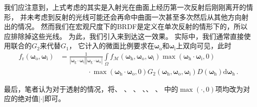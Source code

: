 我们应注意到，上式考虑的其实是入射光在曲面上经历第一次反射后刚刚离开的情形，
并未考虑到反射的光线可能还会再命中曲面一次甚至多次然后从其他方向射出的情况。
然而我们在宏观尺度下的BRDF是定义在单次反射的情形下的，所以应排除掉这些光线。
为此，我们引入来到达这一效果。
实际中，我们通常直接使用联合的$G_2$来代替$G_1$，
它计入的微面比例要求在${\bm\omega}_{\mathrm{o}}$和${\bm\omega}_{\mathrm{i}}$上双向可见，此时
\begin{align}\label{eq:08ex01-MacroBRDFG2}
    f_{\mathrm{r}}({\bm\omega}_{\mathrm{o}},{\bm\omega}_{\mathrm{i}})
     & =\frac{1}{|{\bm\omega}_{\mathrm{g}}\cdot{\bm\omega}_{\mathrm{i}}||{\bm\omega}_{\mathrm{g}}\cdot{\bm\omega}_{\mathrm{o}}|}
    \int\limits_{\varOmega}f_{\mathcal{M}}({\bm\omega}_{\mathrm{h}},{\bm\omega}_{\mathrm{o}},{\bm\omega}_{\mathrm{i}})
    \max({\bm\omega}_{\mathrm{h}}\cdot{\bm\omega}_{\mathrm{i}},0)\nonumber                                                       \\
     & \qquad\qquad\cdot\max({\bm\omega}_{\mathrm{h}}\cdot{\bm\omega}_{\mathrm{o}},0)
    G_2({\bm\omega}_{\mathrm{h}},{\bm\omega}_{\mathrm{o}},{\bm\omega}_{\mathrm{i}})
    D({\bm\omega}_{\mathrm{h}})\mathrm{d}{\bm\omega}_{\mathrm{h}}\, .
\end{align}

最后，笔者认为对于透射的情况，将、
、
、
、、
、
中的$\max(\cdot,0)$项均改为对应的绝对值$|\cdot|$即可。

